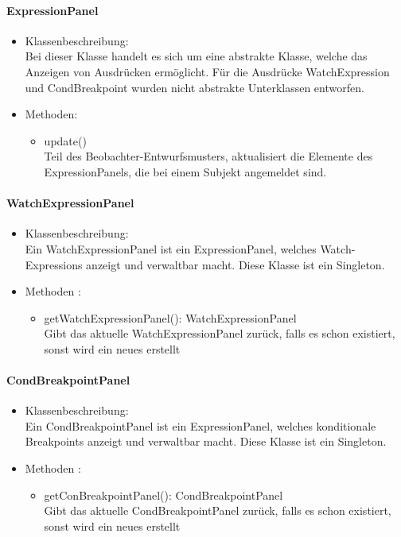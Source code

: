 \documentclass[parskip=full]{scrartcl}
\begin{document}
\paragraph{ExpressionPanel}
\begin{itemize}
\item Klassenbeschreibung: \\
Bei dieser Klasse handelt es sich um eine abstrakte Klasse, welche das Anzeigen von Ausdrücken ermöglicht. Für die Ausdrücke WatchExpression und CondBreakpoint wurden nicht abstrakte Unterklassen entworfen.
\item Methoden: \\
\begin{itemize}
\item update() \\ Teil des Beobachter-Entwurfsmusters, aktualisiert die Elemente des ExpressionPanels, die bei einem Subjekt angemeldet sind.
\end{itemize}
\end{itemize}

\paragraph{WatchExpressionPanel}
\begin{itemize}
\item Klassenbeschreibung: \\
Ein WatchExpressionPanel ist ein ExpressionPanel, welches Watch-Expressions anzeigt und verwaltbar macht. Diese Klasse ist ein Singleton.
\item Methoden :\\
\begin{itemize}
\item getWatchExpressionPanel(): WatchExpressionPanel \\
Gibt das aktuelle WatchExpressionPanel zurück, falls es schon existiert, sonst wird ein neues erstellt
\end{itemize}
\end{itemize}

\paragraph{CondBreakpointPanel}
\begin{itemize}
\item Klassenbeschreibung: \\
Ein CondBreakpointPanel ist ein ExpressionPanel, welches konditionale Breakpoints anzeigt und verwaltbar macht. Diese Klasse ist ein Singleton.
\item Methoden :\\
\begin{itemize}
\item getConBreakpointPanel(): CondBreakpointPanel \\
Gibt das aktuelle CondBreakpointPanel zurück, falls es schon existiert, sonst wird ein neues erstellt
\end{itemize}
\end{itemize}
\end{document}
